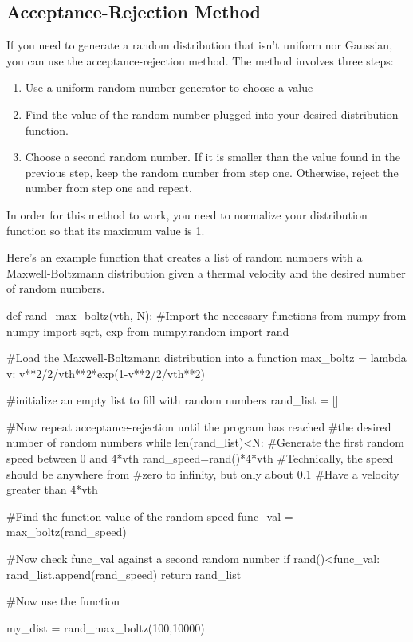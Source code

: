 \subsection*{Acceptance-Rejection Method}
If you need to generate a random distribution that isn't uniform nor Gaussian, you can use the acceptance-rejection method.  The method involves three steps:
\begin{enumerate}
\item Use a uniform random number generator to choose a value
\item Find the value of the random number plugged into your desired distribution function.
\item Choose a second random number.  If it is smaller than the value found in the previous step, keep the random number from step one.  Otherwise, reject the number from step one and repeat.
\end{enumerate}
In order for this method to work, you need to normalize your distribution function so that its maximum value is 1.

Here's an example function that creates a list of random numbers with a Maxwell-Boltzmann distribution
given a thermal velocity and the desired number of random numbers.

\begin{codeexample}
\begin{VerbatimOut}{\listingFile}
def rand_max_boltz(vth, N):
    #Import the necessary functions from numpy
    from numpy import sqrt, exp
    from numpy.random import rand

    #Load the Maxwell-Boltzmann distribution into a function
    max_boltz = lambda v: v**2/2/vth**2*exp(1-v**2/2/vth**2)

    #initialize an empty list to fill with random numbers
    rand_list = []

    #Now repeat acceptance-rejection until the program has reached
    #the desired number of random numbers
    while len(rand_list)<N:
        #Generate the first random speed between 0 and 4*vth
        rand_speed=rand()*4*vth #Technically, the speed should be anywhere from
                           #zero to infinity, but only about 0.1%
                           #Have a velocity greater than 4*vth


        #Find the function value of the random speed
        func_val = max_boltz(rand_speed)

        #Now check func_val against a second random number
        if rand()<func_val:
            rand_list.append(rand_speed)
    return rand_list

#Now use the function

my_dist = rand_max_boltz(100,10000)
\end{VerbatimOut}
\end{codeexample}

